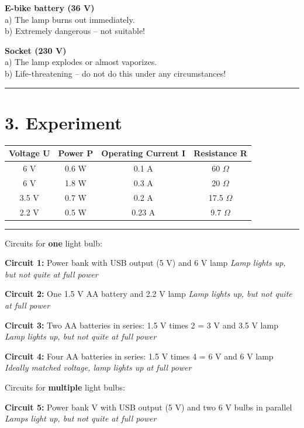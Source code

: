 \documentclass[a4paper,12pt]{article}
\begin{document}
		\textbf{E-bike battery (36 V)} \\
		a) The lamp burns out immediately. \\
		b) Extremely dangerous – not suitable!
		
		\textbf{Socket (230 V)} \\
		a) The lamp explodes or almost vaporizes. \\
		b) Life-threatening – do not do this under any circumstances!
		
		\hrule
		
		\section*{3. Experiment}
		
		\renewcommand{\arraystretch}{2}
		\begin{tabular}{|c|c|c|c|}
			\hline
			Voltage U & Power P & Operating Current I & Resistance R \\
			\hline
			6 V & 0.6 W & 0.1 A & 60 $\Omega$\\
			\hline
			6 V & 1.8 W & 0.3 A & 20 $\Omega$\\
			\hline
			3.5 V & 0.7 W & 0.2 A & 17.5 $\Omega$\\
			\hline
			2.2 V & 0.5 W & 0.23 A & 9.7 $\Omega$ \\
			\hline
		\end{tabular}
		\hrule
		
		\newpage
		
		Circuits for \textbf{one} light bulb:
		
		\textbf{Circuit 1:}
		Power bank with USB output (5 V) and 6 V lamp
		\textit{Lamp lights up, but not quite at full power}
		
		\textbf{Circuit 2:}
		One 1.5 V AA battery and 2.2 V lamp
		\textit{Lamp lights up, but not quite at full power}
		
		\textbf{Circuit 3:}
		Two AA batteries in series: 1.5 V times 2 = 3 V and 3.5 V lamp
		\textit{Lamp lights up, but not quite at full power}
		
		\textbf{Circuit 4:}
		Four AA batteries in series: 1.5 V times 4 = 6 V and 6 V lamp
		\textit{Ideally matched voltage, lamp lights up at full power}
		
		Circuits for \textbf{multiple} light bulbs:
		
		\textbf{Circuit 5:}
		Power bank V with USB output (5 V) and two 6 V bulbs in parallel
		\textit{Lamps light up, but not quite at full power}
		
\end{document}

